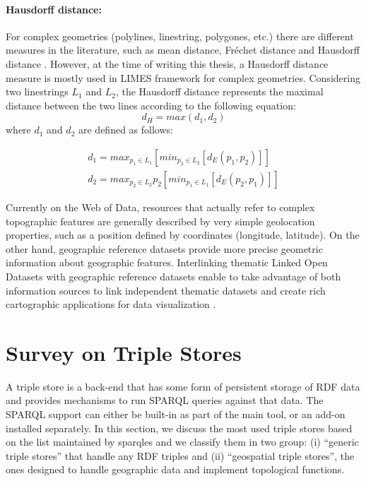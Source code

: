 \paragraph{Hausdorff distance:}
For complex geometries (polylines, linestring, polygones, etc.) there are different measures in the literature, such as mean distance, Fr\'echet distance and Hausdorff distance \cite{anamaria08}. However, at the time of writing this thesis, a Hausdorff distance measure is mostly used in LIMES framework for complex geometries. Considering two linestrings $L_{1}$ and $L_{2}$, the Hausdorff distance represents the maximal distance between the two lines according to the following equation:
\begin{equation}
d_{H} = max(d_{1}, d_{2} )
\end{equation}
where $d_{1}$ and $d_{2}$ are defined as follows:


\begin{align}
d_{1} = max_{p_{1} \in L_{1}}[min_{p_{2} \in L_{2}}[d_{E}(p_{1}, p_{2})]] \\
d_{2} = max_{p_{2} \in L_{2}}{p_{2}}[min_{p_{1} \in L_{1}}[d_{E}(p_{2}, p_{1})]]
\end{align}



Currently on the Web of Data, resources that actually refer to complex topographic features are generally described by very simple geolocation properties, such as a position defined by coordinates (longitude, latitude). On the other hand, geographic reference datasets provide more precise geometric information about geographic features. Interlinking thematic Linked Open Datasets with geographic reference datasets enable to take advantage of both information sources to link independent thematic datasets and create rich cartographic applications for data visualization \cite{feliachi2013}.


\section{Survey on Triple Stores}
\label{sec:surveytps}

A triple store is a back-end that has some form of persistent storage of RDF data and provides mechanisms to run SPARQL \cite{sparql11} queries against that data. The SPARQL support can either be built-in as part of the main tool, or an add-on installed separately. In this section, we discuss the most used triple stores based on the list maintained by sparqles \cite{sparqles13} and we classify them in two group: (i) ``generic triple stores'' that handle any RDF triples and (ii) ``geospatial triple stores'', the ones designed to handle geographic data and implement topological functions.


